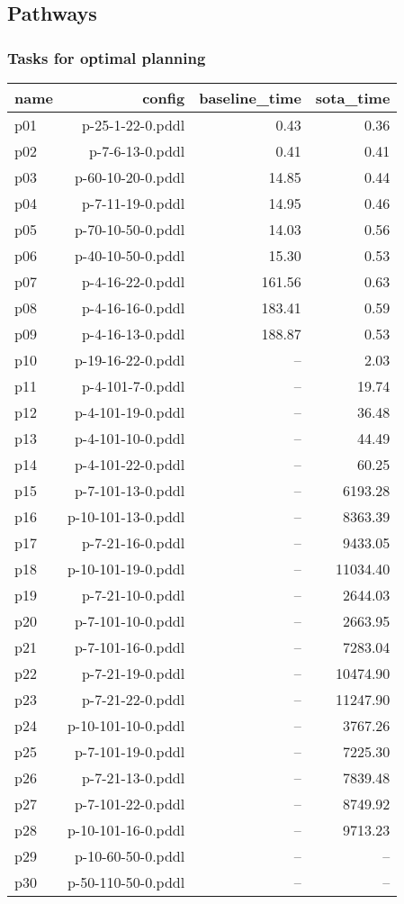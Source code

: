 \documentclass{article}
\begin{document}
                \newpage \subsection{Pathways}
                    \subsubsection*{Tasks for optimal planning}
                    
                            \begin{center}
                            \scriptsize
                            \begin{tabular}{@{}l|r|r|r@{}}
                            name & config & baseline\_time & sota\_time\\\midrule
                              p01& p-25-1-22-0.pddl&0.43&0.36\\
  p02& p-7-6-13-0.pddl&0.41&0.41\\
  p03& p-60-10-20-0.pddl&14.85&0.44\\
  p04& p-7-11-19-0.pddl&14.95&0.46\\
  p05& p-70-10-50-0.pddl&14.03&0.56\\
  p06& p-40-10-50-0.pddl&15.30&0.53\\
  p07& p-4-16-22-0.pddl&161.56&0.63\\
  p08& p-4-16-16-0.pddl&183.41&0.59\\
  p09& p-4-16-13-0.pddl&188.87&0.53\\
  p10& p-19-16-22-0.pddl&--&2.03\\
  p11& p-4-101-7-0.pddl&--&19.74\\
  p12& p-4-101-19-0.pddl&--&36.48\\
  p13& p-4-101-10-0.pddl&--&44.49\\
  p14& p-4-101-22-0.pddl&--&60.25\\
  p15& p-7-101-13-0.pddl&--&6193.28\\
  p16& p-10-101-13-0.pddl&--&8363.39\\
  p17& p-7-21-16-0.pddl&--&9433.05\\
  p18& p-10-101-19-0.pddl&--&11034.40\\
  p19& p-7-21-10-0.pddl&--&2644.03\\
  p20& p-7-101-10-0.pddl&--&2663.95\\
  p21& p-7-101-16-0.pddl&--&7283.04\\
  p22& p-7-21-19-0.pddl&--&10474.90\\
  p23& p-7-21-22-0.pddl&--&11247.90\\
  p24& p-10-101-10-0.pddl&--&3767.26\\
  p25& p-7-101-19-0.pddl&--&7225.30\\
  p26& p-7-21-13-0.pddl&--&7839.48\\
  p27& p-7-101-22-0.pddl&--&8749.92\\
  p28& p-10-101-16-0.pddl&--&9713.23\\
  p29& p-10-60-50-0.pddl&--&--\\
  p30& p-50-110-50-0.pddl&--&--
                            \end{tabular}
                            \end{center}
                    
\end{document}
